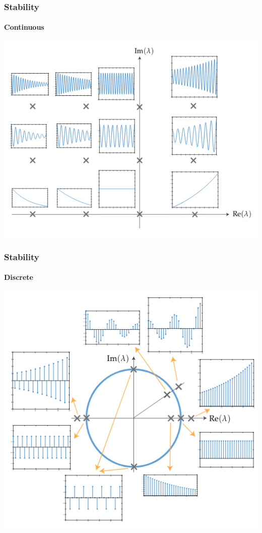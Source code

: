 \documentclass[aspectratio=169]{beamer}
\begin{document}
\begin{frame}
    \frametitle{Stability}
    \framesubtitle{Continuous}
    
    \centering
    \includegraphics[width=\textheight]{continuous.png}
\end{frame}

\begin{frame}
    \frametitle{Stability}
    \framesubtitle{Discrete}
    
    \centering
    \includegraphics[width=\textheight]{discrete.png}
\end{frame}
\end{document}
